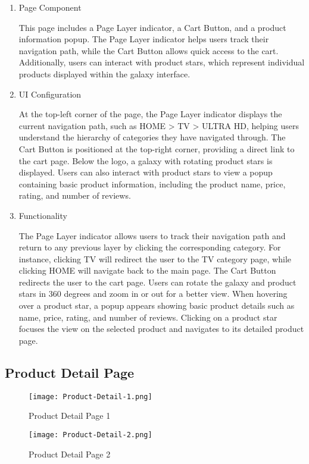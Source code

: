 \documentclass[conference]{IEEEtran}
\begin{document}
\begin{enumerate}
\setlength{\parindent}{2ex}
\setlength{\parskip}{0.5em}
\item Page Component

This page includes a Page Layer indicator, a Cart Button, and a product information popup. The Page Layer indicator helps users track their navigation path, while the Cart Button allows quick access to the cart. Additionally, users can interact with product stars, which represent individual products displayed within the galaxy interface.

\item UI Configuration

At the top-left corner of the page, the Page Layer indicator displays the current navigation path, such as HOME > TV > ULTRA HD, helping users understand the hierarchy of categories they have navigated through. The Cart Button is positioned at the top-right corner, providing a direct link to the cart page. Below the logo, a galaxy with rotating product stars is displayed. Users can also interact with product stars to view a popup containing basic product information, including the product name, price, rating, and number of reviews.

\item Functionality

The Page Layer indicator allows users to track their navigation path and return to any previous layer by clicking the corresponding category. For instance, clicking TV will redirect the user to the TV category page, while clicking HOME will navigate back to the main page. The Cart Button redirects the user to the cart page. Users can rotate the galaxy and product stars in 360 degrees and zoom in or out for a better view. When hovering over a product star, a popup appears showing basic product details such as name, price, rating, and number of reviews. Clicking on a product star focuses the view on the selected product and navigates to its detailed product page.

\end{enumerate}


\subsection{Product Detail Page}
\begin{figure}[H]
    \centering
    \texttt{[image: Product-Detail-1.png]}
    \caption{Product Detail Page 1}
    \label{fig:Product Detail Page 1}
\end{figure}
\begin{figure}[H]
    \centering
    \texttt{[image: Product-Detail-2.png]}
    \caption{Product Detail Page 2}
    \label{fig:Product Detail Page 2}
\end{figure}
\end{document}
